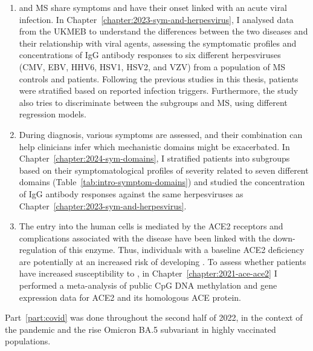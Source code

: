 \begin{enumerate}
    \item \cfs and MS share symptoms and have their onset linked with an acute viral infection. In Chapter~\ref{chapter:2023-sym-and-herpesvirus}, I analysed data from the UKMEB to understand the differences between the two diseases and their relationship with viral agents, assessing the symptomatic profiles and concentrations of IgG antibody responses to six different herpesviruses (CMV, EBV, HHV6, HSV1, HSV2, and VZV) from a population of MS controls and \cfs patients. Following the previous studies in this thesis, \cfs patients were stratified based on reported infection triggers. Furthermore, the study also tries to discriminate between the \cfs subgroups and MS, using different regression models.

    \item During \cfs diagnosis, various symptoms are assessed, and their combination can help clinicians infer which mechanistic domains might be exacerbated. In Chapter~\ref{chapter:2024-sym-domains}, I stratified patients into subgroups based on their symptomatological profiles of severity related to seven different domains (Table~\ref{tab:intro-symptom-domains}) and studied the concentration of IgG antibody responses against the same herpesviruses as Chapter~\ref{chapter:2023-sym-and-herpesvirus}.
    
    \item The \sars entry into the human cells is mediated by the ACE2 receptors and complications associated with the disease have been linked with the down-regulation of this enzyme. Thus, individuals with a baseline ACE2 deficiency are potentially at an increased risk of developing \covid. To assess whether \cfs patients have increased susceptibility to \covid, in Chapter~\ref{chapter:2021-ace-ace2} I performed a meta-analysis of public CpG DNA methylation and gene expression data for ACE2 and its homologous ACE protein.
\end{enumerate}

Part~\ref{part:covid} was done throughout the second half of 2022, in the context of the \covid pandemic and the rise \sars Omicron BA.5 subvariant in highly vaccinated populations.

